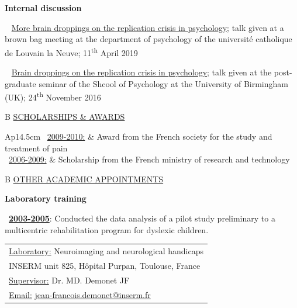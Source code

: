 \documentclass[a4paper,12pt,oneside]{letter}
\begin{document}
{\textbf{Internal discussion}


\textbullet~ \href{https://osf.io/vu327/}{More brain droppings on the replication crisis in psychology}; talk given at a brown bag meeting at the department of psychology of the université catholique de Louvain la Neuve; 11\textsuperscript{th} April 2019

\textbullet~ \href{https://dx.doi.org/10.6084/m9.figshare.4257992.v1}{Brain droppings on the replication crisis in psychology}; talk given at the post-graduate seminar of the Shcool of Psychology at the University of Birmingham (UK); 24\textsuperscript{th} November 2016




\medskip 

\begin{tabular}{B}
 \underline{SCHOLARSHIPS \& AWARDS}
\end{tabular}

\begin{tabular}{Ap{14.5cm}}
\textbullet~\underline{2009-2010:} & Award from the French society for the study and treatment of pain\\
     
\textbullet~\underline{2006-2009:} & Scholarship from the French ministry of research and technology \\
\end{tabular}



\medskip 

\begin{tabular}{B}
 \underline{OTHER ACADEMIC APPOINTMENTS}
\end{tabular}

\begin{center}
\large\textbf{Laboratory training}
\end{center}

\begin{minipage}[c]{7.7cm}
\textbullet~\underline{\textbf{2003-2005}}: Conducted the data analysis of a pilot study preliminary to a multicentric rehabilitation program for dyslexic children.
\end{minipage}
\hfill
\begin{minipage}[c]{10cm}
\setlength\minrowclearance{0.2cm}
\setlength\arrayrulewidth{1.5pt}
\small
\begin{tabular}[t]{|l|}\hline
\underline{Laboratory:} Neuroimaging and neurological handicaps\\
INSERM unit 825, Hôpital Purpan, Toulouse, France\\
\underline{Supervisor:} Dr. MD. Demonet JF\\
\underline{Email:} \href{mailto:jean-francois.demonet@inserm.fr}{jean-francois.demonet@inserm.fr}\\
\hline
\end{tabular}
\end{minipage}

}
\end{document}
